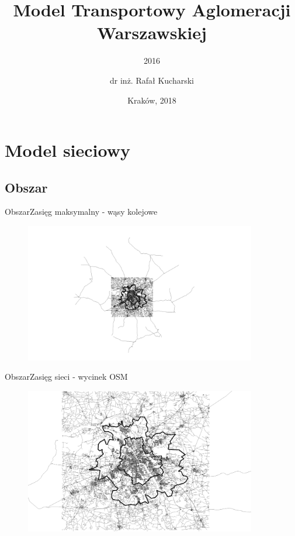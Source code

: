\documentclass[8pt]{beamer}
\title[Kraków, 2018] %
{Model Transportowy Aglomeracji Warszawskiej}
\subtitle
{2016}
\author[dr in\.z. Rafa\l{} Kucharski] %
{dr in\.z. Rafa\l{} Kucharski\inst{1}}
\institute[] %
{
  \inst{1}%
  Katedra System\'{o}w Transportowych\\
  Politechnika Krakowska
 }
\date[KST, L-2, WIL, PK] %
{Krak\'{o}w, 2018}
\begin{document}
\begin{frame}
  \titlepage
\end{frame}

\section{Model sieciowy}
\subsection{Obszar}
\begin{frame}{Obszar}{Zasięg maksymalny - wąsy kolejowe}
\begin{figure}
\begin{center}
\includegraphics[width=0.9\textwidth]{n1}
 \end{center}  
 \end{figure} 
\end{frame}

\begin{frame}{Obszar}{Zasięg sieci - wycinek OSM}
\begin{figure}
\begin{center}
\includegraphics[width=0.9\textwidth]{n2}
 \end{center}
 \end{figure} 
\end{frame}
\end{document}

